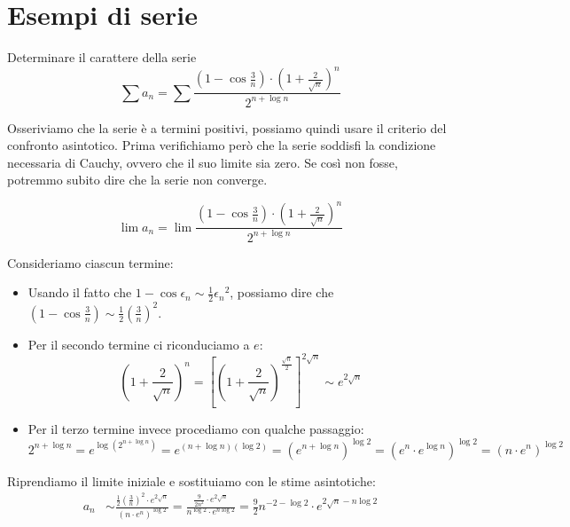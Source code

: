 \section{Esempi di serie}

\begin{example}
Determinare il carattere della serie
\begin{equation*}
\sum a_n = \sum \frac{\left(1 - \cos \frac{3}{n}\right)\cdot \left(1 + \frac{2}{\sqrt{n}} \right)^n}{2^{n+\log n}}
\end{equation*}

Osseriviamo che la serie è a termini positivi, possiamo quindi usare il criterio del confronto asintotico. Prima verifichiamo però che la serie soddisfi la condizione necessaria di Cauchy, ovvero che il suo limite sia zero. Se così non fosse, potremmo subito dire che la serie non converge.

\begin{equation*}
\lim a_n = \lim \frac{\left(1 - \cos \frac{3}{n}\right)\cdot \left(1 + \frac{2}{\sqrt{n}} \right)^n}{2^{n+\log n}}
\end{equation*}

Consideriamo ciascun termine:
\begin{itemize}
\item Usando il fatto che $1 - \cos \epsilon_n \sim \frac{1}{2} {\epsilon_n}^2$, possiamo dire che $(1-\cos \frac{3}{n}) \sim \frac{1}{2} (\frac{3}{n})^2$.
\item Per il secondo termine ci riconduciamo a $e$:
\begin{equation*}
\left(1 + \frac{2}{\sqrt{n}} \right)^n = \left[\left(1 + \frac{2}{\sqrt{n}} \right)^{\frac{\sqrt{n}}{2}} \right]^{2\sqrt{n}} \sim e^{2 \sqrt{n}}
\end{equation*}
\item Per il terzo termine invece procediamo con qualche passaggio:
\begin{equation*}
2^{n+\log n} = e^{\log(2^{n+\log n})} = e^{(n+\log n)(\log 2)} = (e^{n+\log n})^{\log 2} = (e^n \cdot e^{\log n})^{\log 2} = (n \cdot e^n)^{\log 2}
\end{equation*}
\end{itemize}

Riprendiamo il limite iniziale e sostituiamo con le stime asintotiche:
\begin{align*}
a_n &\sim \frac{\frac{1}{2}\left(\frac{3}{n} \right)^2 \cdot e^{2\sqrt{n}}}{(n \cdot e^n)^{\log 2}} = \frac{\frac{9}{2n^2} \cdot e^{2\sqrt{n}}}{n^{\log 2} \cdot e^{n \log 2}} = \frac{9}{2}n^{-2 - \log 2} \cdot e^{2\sqrt{n} - n\log 2}
\end{align*}


\end{example}
